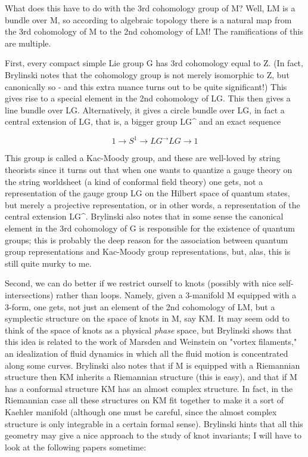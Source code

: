 What does this have to do with the 3rd cohomology group of M?  Well, LM
is a bundle over M, so according to algebraic topology there is a
natural map from the 3rd cohomology of M to the 2nd cohomology of LM!
The ramifications of this are multiple.  

First, every compact simple Lie group G has 3rd cohomology equal to Z.
(In fact, Brylinski notes that the cohomology group is not merely
isomorphic to Z, but canonically so - and this extra nuance turns out to
be quite significant!)  This gives rise to a special element in the 2nd
cohomology of LG.  This then gives a line bundle over LG.
Alternatively, it gives a circle bundle over LG, in fact a central
extension of LG, that is, a bigger group LG^ and an exact sequence


$$

             1 \to  S^1 \to  LG^ \to  LG \to  1
$$
    

This group is called a Kac-Moody group, and these are well-loved by
string theorists since it turns out that when one wants to quantize a
gauge theory on the string worldsheet (a kind of conformal field theory)
one gets, not a representation of the gauge group LG on the Hilbert
space of quantum states, but merely a projective representation, or in
other words, a representation of the central extension LG^.  Brylinski
also notes that in some sense the canonical element in the 3rd
cohomology of G is responsible for the existence of quantum groups; this
is probably the deep reason for the association between quantum group
representations and Kac-Moody group representations, but, alas, this is
still quite murky to me.

Second, we can do better if we restrict ourself to knots (possibly with
nice self-intersections) rather than loops.  Namely, given a 3-manifold
M equipped with a 3-form, one gets, not just an element of the 2nd
cohomology of LM, but a symplectic structure on the space of knots in M,
say KM.  It may seem odd to think of the space of knots as a physical
\emph{phase} space, but Brylinski shows that this idea is related to the work
of Marsden and Weinstein on "vortex filaments," an idealization of fluid
dynamics in which all the fluid motion is concentrated along some
curves.  Brylinski also notes that if M is equipped with a Riemannian
structure then KM inherits a Riemannian structure (this is easy), and
that if M has a conformal structure KM has an almost complex structure.
In fact, in the Riemannian case all these structures on KM fit together
to make it a sort of Kaehler manifold (although one must be careful,
since the almost complex structure is only integrable in a certain
formal sense).  Brylinski hints that all this geometry may give a
nice approach to the study of knot invariants; I will have to look at
the following papers sometime:

